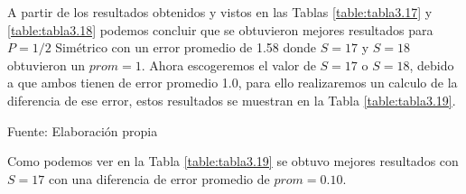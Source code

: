 A partir de los resultados obtenidos y vistos en las Tablas \ref{table:tabla3.17} y \ref{table:tabla3.18} podemos concluir que se obtuvieron mejores resultados para $P = 1/2$ Simétrico con un error promedio de 1.58 donde $S = 17$ y $S = 18$ obtuvieron un $prom = 1$.
\vskip 0.5cm
Ahora escogeremos el valor de $S = 17$ o $S = 18$, debido a que ambos tienen de error promedio 1.0, para ello realizaremos un calculo de la diferencia de ese error, estos resultados se muestran en la Tabla \ref{table:tabla3.19}.
\vskip 0.5cm
\begin{center}
\begin{table}[H]
\centering
\caption{\small{Resultados del testeo del sistema para P = 1 simétrico con S = 17 y 18.}}
\label{table:tabla3.19}
\begin{center}
\vskip 0.1cm
{\small{Fuente: Elaboración propia}}
\end{center}
\end{table}
\end{center}
\vskip -0.7cm
Como podemos ver en la Tabla \ref{table:tabla3.19} se obtuvo mejores resultados con $S = 17$ con una diferencia de error promedio de $prom = 0.10$.


